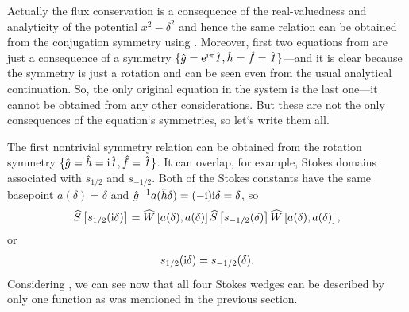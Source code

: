 \documentclass[12pt]{iopart}
\def\S{\widehat{S}}
\def\W{\widehat{W}}
\def\f{\hat{f}}
\def\g{\hat{g}}
\def\h{\hat{h}}
\def\unity{\hat{\it 1}}
\begin{document}
Actually the flux conservation is a consequence of the real-valuedness and analyticity 
of the potential $x^2-\delta^2$ and hence the same relation can be obtained from the 
conjugation symmetry using . Moreover, first two equations from  
are just a consequence of a symmetry $\{\g=\rme^{\rmi\pi}\unity,\h=\f=\unity\}$---and it is clear 
because the symmetry is just a rotation and can be seen even from the usual analytical continuation. 
So, the only original equation in the system  is the last one---it cannot 
be obtained from any other considerations. But these are not the only consequences of the 
equation`s symmetries, so let`s write them all.


The first nontrivial symmetry relation can be obtained from the rotation symmetry 
$\{\g=\h=\rmi\unity,\f=\unity\}$. It can overlap, for example, Stokes domains associated with
$s_{1/2}$ and $s_{-1/2}$. Both of the Stokes constants have the same 
basepoint $a(\delta)=\delta$ and $\g^{-1}a(\h\delta)=(-\rmi)\rmi\delta=\delta$, so
\begin{eqnarray}
\S \left[ s_{1/2}(\rmi \delta) \right] = 
\W \left[ a(\delta), a(\delta) \right]
\S \left[ s_{-1/2}(\delta) \right]
\W \left[ a(\delta), a(\delta) \right],
\end{eqnarray}
or
\begin{eqnarray}
s_{1/2}(\mathrm{i} \delta) = s_{-1/2}(\delta).
\label{eq:websym_1}
\end{eqnarray}
Considering , we can 
see now that all four Stokes wedges can be described by only one function as 
was mentioned in the previous section. 
\end{document}
